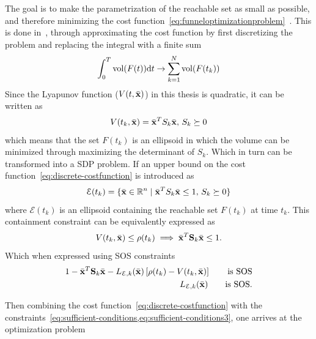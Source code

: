The goal is to make the parametrization of the reachable set as small as
possible, and therefore minimizing the cost
function~\cref{eq:funneloptimizationproblem}~. This is done
in~\cite{majumdarFunnelLibrariesRealtime2017}, through approximating the cost
function by first discretizing the problem and replacing the integral with a
finite sum
\begin{equation}
  \int_{0}^{T} \operatorname{vol}(F(t)) \mathrm{d}t \rightarrow \sum_{k=1}^{N} \operatorname{vol}(F(t_{k})) \label{eq:discrete-costfunction}
\end{equation}
Since the Lyapunov function (\(V(t,\bar{\mathbf{x}})\)) in this thesis is
quadratic, it can be written as
\begin{equation}
  V(t_{k}, \bar{\mathbf{x}}) = {\bar{\mathbf{x}}}^{T}S_{k}\bar{\mathbf{x}}, \, S_{k} \succeq 0
\end{equation}
which means that the set \(F(t_{k})\) is an ellipsoid in which the volume can be
minimized through maximizing the determinant of \(S_{k}\). Which in turn can be
transformed into a \ac{SDP} problem. If an upper bound on the cost
function~\cref{eq:discrete-costfunction} is introduced as
\begin{equation}
  \mathcal{E} (t_{k}) = \lbrace\bar{\mathbf{x}} \in \mathbb{R}^n \mid {\bar{\mathbf{x}}}^{T}S_{k}\bar{\mathbf{x}} \leq 1, \, S_{k} \succeq 0\rbrace
\end{equation}
where \( \mathcal{E} ( t_{k} ) \) is an ellipsoid containing the reachable set
\( F ( t_{k} ) \) at time \( t_{k} \). This containment constraint can be
equivalently expressed as
\begin{equation}
  V ( t_{k}, \bar{\mathbf{x}} ) \leq \rho(t_{k})  \implies {\bar{\mathbf{x}}}^{T}\mathbf{S}_{k}\bar{\mathbf{x}} \leq 1.
\end{equation}
Which when expressed using \ac{SOS} constraints
\begin{align}
  1 - {\bar{\mathbf{x}}}^{T}\mathbf{S}_{k}\bar{\mathbf{x}} - L_{\mathcal{E},k}(\bar{\mathbf{x}})\left[ \rho(t_{k}) - V(t_{k}, \bar{\mathbf{x}}) \right]  \qquad \text{is SOS}& \\
  L_{\mathcal{E},k}(\bar{\mathbf{x}}) \qquad \text{is SOS.}& \\
\end{align}

Then combining the cost function~\cref{eq:discrete-costfunction} with the
constraints~\cref{eq:sufficient-conditions,eq:sufficient-conditions3}, one
arrives at the optimization problem

